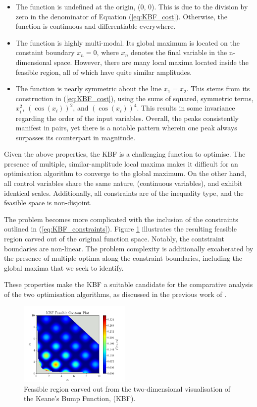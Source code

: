 \documentclass[10pt]{article}
\begin{document}
\begin{multicols}{2}
\begin{itemize}
    \item The function is undefined at the origin, (0, 0). This is due to the division by zero in the denominator of Equation (\ref{eq:KBF_cost}). Otherwise, the function is continuous and differentiable everywhere.
    \item The function is highly multi-modal. Its global maximum is located on the constaint boundary $x_{n}=0$, where $x_n$ denotes the final variable in the n-dimensional space. However, there are many local maxima located inside the feasible region, all of which have quite similar amplitudes.
    \item The function is nearly symmetric about the line $x_1=x_2$. This stems from its construction in (\ref{eq:KBF_cost}), using the sums of squared, symmetric terms, $x_i^2$, $(\cos(x_i))^2$, and $(\cos(x_i))^4$. This results in some invariance regarding the order of the input variables. Overall, the peaks consistently manifest in pairs, yet there is a notable pattern wherein one peak always surpasses its counterpart in magnitude.
\end{itemize}

Given the above properties, the KBF is a challenging function to optimise. The presence of multiple, similar-amplitude local maxima makes it difficult for an optimisation algorithm to converge to the global maximum. On the other hand, all control variables share the same nature, (continuous variables), and exhibit identical scales. Additionally, all constraints are of the inequality type, and the feasible space is non-disjoint.

The problem becomes more complicated with the inclusion of the constraints outlined in (\ref{eq:KBF_constraints}). Figure \ref{fig:KBF_Feasible} illustrates the resulting feasible region carved out of the original function space. Notably, the contstraint boundaries are non-linear. The problem complexity is additionally excaberated by the presence of multiple optima along the constraint boundaries, including the global maxima that we seek to identify.

These properties make the KBF a suitable candidate for the comparative analysis of the two optimisation algorithms, as discussed in the previous work of \cite{ELBELTAGY1999639}.

\begin{figure}[H]
    \centering
    \includegraphics[width=0.48\textwidth]{../figures/KBF/KBF Feasible_contour.png}
    \captionsetup{justification=centering}
    \caption{Feasible region carved out from the two-dimensional visualisation of the Keane's Bump Function, (KBF).}
    \label{fig:KBF_Feasible}
\end{figure}


\end{multicols}
\end{document}
